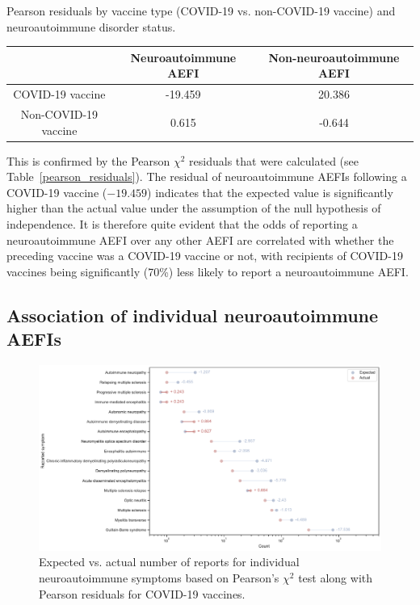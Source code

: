 \documentclass[idr,communication,submit,oneauthor,pdftex]{Definitions/mdpi}
\begin{document}
\begin{specialtable}[H]
\caption{Pearson residuals by vaccine type (COVID-19 vs. non-COVID-19 vaccine) and neuroautoimmune
disorder status.\label{pearson_residuals}}
\begin{tabular}{ccc}
\toprule
& \textbf{Neuroautoimmune AEFI}	& \textbf{Non-neuroautoimmune AEFI}\\
\midrule
COVID-19 vaccine	    	& -19.459			    & 20.386  \\
Non-COVID-19 vaccine		& 0.615			        & -0.644\\
\bottomrule
\end{tabular}
\end{specialtable}

This is confirmed by the Pearson $\chi^2$ residuals that were calculated (see Table~\ref{pearson_residuals}). The residual of neuroautoimmune AEFIs following a COVID-19 vaccine ($-19.459$) indicates that the expected value is significantly higher than the actual value under the assumption of the null hypothesis of independence. It is therefore quite evident that the odds of reporting a neuroautoimmune AEFI over any other AEFI are correlated with whether the preceding vaccine was a COVID-19 vaccine or not, with recipients of COVID-19 vaccines being significantly (70\%) less likely to report a neuroautoimmune AEFI.

\subsection{Association of individual neuroautoimmune AEFIs}

\begin{figure}[H]
\includegraphics[width=12.5 cm]{expected_vs_actual_by_symptoms}
\caption{Expected vs. actual number of reports for individual neuroautoimmune symptoms based on Pearson's $\chi^2$ test
along with Pearson residuals for COVID-19 vaccines.\label{expected_vs_actual}}
\end{figure}
\end{document}
